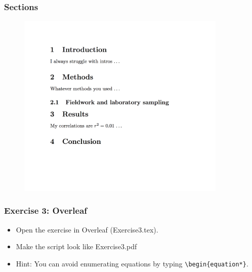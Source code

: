 \begin{frame}[fragile]
\frametitle{Sections}
\begin{figure}
\includegraphics[width=100mm]{figures/example_2.png}
\end{figure}
\end{frame}


\begin{frame}[fragile]
\frametitle{Exercise 3: Overleaf}
\begin{itemize}
\item Open the exercise in Overleaf (Exercise3.tex).
\item Make the script look like Exercise3.pdf
\item  Hint: You can avoid enumerating equations by typing \verb|\begin{equation*}|.
\end{itemize}
\end{frame}

